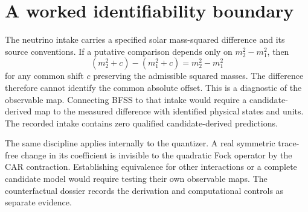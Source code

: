 
\section{A worked identifiability boundary}
The neutrino intake carries a specified solar mass-squared
difference and its source conventions. If a putative comparison
depends only on \(m_2^2-m_1^2\), then
\[
 (m_2^2+c)-(m_1^2+c)=m_2^2-m_1^2
\]
for any common shift \(c\) preserving the admissible squared masses.
The difference therefore cannot identify the common absolute offset.
This is a diagnostic of the observable map. Connecting BFSS to that
intake would require a candidate-derived map to the measured
difference with identified physical states and units. The recorded
intake contains zero qualified candidate-derived predictions.

The same discipline applies internally to the quantizer. A real
symmetric trace-free change in its coefficient is invisible to
the quadratic Fock operator by the CAR contraction. Establishing
equivalence for other interactions or a complete candidate model
would require testing their own observable maps. The
counterfactual dossier records the derivation and computational
controls as separate evidence.
